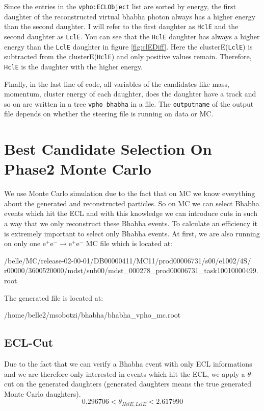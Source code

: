 \documentclass[a4paper,11pt,twosided,final,german,openbib,pdftex,listof=totoc,bibliography=totoc]{scrbook}
\begin{document}
Since the entries in the \texttt{vpho:ECLObject} list are sorted by energy, the first daughter of the reconstructed virtual bhabha photon always has a higher energy than the second daughter. I will refer to the first daughter as \texttt{HclE} and the second daughter as \texttt{LclE}. You can see that the \texttt{HclE} daughter has always a higher energy than the \texttt{LclE} daughter in figure \ref{fig:clEDiff}. Here the clusterE(\texttt{LclE}) is subtracted from the clusterE(\texttt{HclE}) and only positive values remain. Therefore, \texttt{HclE} is the daughter with the higher energy.

Finally, in the last line of code, all variables of the candidates like mass, momentum, cluster energy of each daughter, does the daughter have a track and so on are written in a tree \texttt{vpho\_bhabha} in a file. The \texttt{outputname} of the output file depends on whether the steering file is running on data or MC. 


\section{Best Candidate Selection On Phase2 Monte Carlo}
\label{sec:SelectingBhabhaMC}

We use Monte Carlo simulation due to the fact that on MC we know everything about the generated and reconstructed particles. So on MC we can select Bhabha events which hit the ECL and with this knowledge we can introduce cuts in such a way that we only reconstruct these Bhabha events. To calculate an efficiency it is extremely  important to select only Bhabha events. At first, we are also running on only one $\textrm{e}^+ \textrm{e}^- \rightarrow \textrm{e}^+ \textrm{e}^-$ MC file which is located at:
\newline

/belle/MC/release-02-00-01/DB00000411/MC11/prod00006731/s00/e1002/4S/
r00000/3600520000/mdst/sub00/mdst\_000278\_prod00006731\_task10010000499.root
\newline

The generated file is located at:

 /home/belle2/msobotzi/bhabha/bhabha\_vpho\_mc.root
\newline


\subsection{ECL-Cut}

Due to the fact that we can verify a Bhabha event with only ECL informations and we are therefore only interested in events which hit the ECL, we apply a $\theta$-cut on the generated daughters (generated daughters means the true generated Monte Carlo daughters). 
\begin{equation}
	0.296706 < \theta_{HclE,LclE} < 2.617990
\end{equation}
\end{document}
